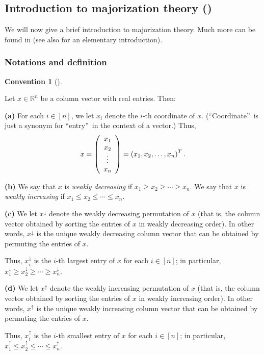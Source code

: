 \documentclass[numbers=enddot,12pt,final,onecolumn,notitlepage]{scrartcl}%
\numberwithin{exer}{subsection}
\theoremstyle{definition}
\newtheorem{conv}[theo]{Convention}
\newenvironment{convention}[1][]
{\begin{conv}[#1]\begin{leftbar}}
{\end{leftbar}\end{conv}}
\begin{document}
\subsection{Introduction to majorization theory (\cite[\S 4.3]{HorJoh13})}

We will now give a brief introduction to majorization theory. Much more can be
found in \cite{MaOlAr11} (see also \cite{Nathan21} for an elementary introduction).

\subsubsection{Notations and definition}

\begin{convention}
\label{conv.major.notations}Let $x\in\mathbb{R}^{n}$ be a column vector with
real entries. Then: \medskip

\textbf{(a)} For each $i\in\left[  n\right]  $, we let $x_{i}$ denote the
$i$-th coordinate of $x$. (\textquotedblleft Coordinate\textquotedblright\ is
just a synonym for \textquotedblleft entry\textquotedblright\ in the context
of a vector.) Thus,%
\[
x=\left(
\begin{array}
[c]{c}%
x_{1}\\
x_{2}\\
\vdots\\
x_{n}%
\end{array}
\right)  =\left(  x_{1},x_{2},\ldots,x_{n}\right)  ^{T}.
\]


\textbf{(b)} We say that $x$ is \emph{weakly decreasing} if $x_{1}\geq
x_{2}\geq\cdots\geq x_{n}$. We say that $x$ is \emph{weakly increasing} if
$x_{1}\leq x_{2}\leq\cdots\leq x_{n}$. \medskip

\textbf{(c)} We let $x^{\downarrow}$ denote the weakly decreasing permutation
of $x$ (that is, the column vector obtained by sorting the entries of $x$ in
weakly decreasing order). In other words, $x^{\downarrow}$ is the unique
weakly decreasing column vector that can be obtained by permuting the entries
of $x$.

Thus, $x_{i}^{\downarrow}$ is the $i$-th largest entry of $x$ for each
$i\in\left[  n\right]  $; in particular, $x_{1}^{\downarrow}\geq
x_{2}^{\downarrow}\geq\cdots\geq x_{n}^{\downarrow}$. \medskip

\textbf{(d)} We let $x^{\uparrow}$ denote the weakly increasing permutation of
$x$ (that is, the column vector obtained by sorting the entries of $x$ in
weakly increasing order). In other words, $x^{\uparrow}$ is the unique weakly
increasing column vector that can be obtained by permuting the entries of $x$.

Thus, $x_{i}^{\uparrow}$ is the $i$-th smallest entry of $x$ for each
$i\in\left[  n\right]  $; in particular, $x_{1}^{\uparrow}\leq x_{2}%
^{\uparrow}\leq\cdots\leq x_{n}^{\uparrow}$.
\end{convention}
\end{document}
